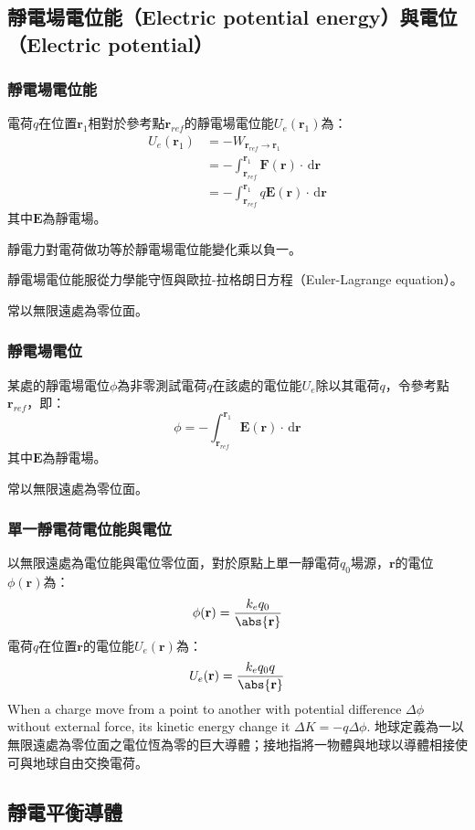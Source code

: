 \documentclass[a4paper,12pt]{report}
\begin{document}
\begin{itemize}
\subsection{靜電場電位能（Electric potential energy）與電位（Electric potential）}
\subsubsection{靜電場電位能}
電荷$q$在位置$\mathbf{r}_1$相對於參考點$\mathbf{r}_{ref}$的靜電場電位能$U_e(\mathbf{r}_1)$為：
\[\begin{aligned}
U_e(\mathbf{r}_1) &= -W_{\mathbf{r}_{ref}\to\mathbf{r}_1}\\
&= -\int_{\mathbf{r}_{ref}}^{\mathbf{r}_1} \mathbf{F}(\mathbf{r})\cdot\,\mathrm{d}\mathbf{r}\\
&= -\int_{\mathbf{r}_{ref}}^{\mathbf{r}_1} q\mathbf{E}(\mathbf{r})\cdot\,\mathrm{d}\mathbf{r}
\end{aligned}\]
其中$\mathbf{E}$為靜電場。

靜電力對電荷做功等於靜電場電位能變化乘以負一。

靜電場電位能服從力學能守恆與歐拉-拉格朗日方程（Euler-Lagrange equation）。

常以無限遠處為零位面。
\subsubsection{靜電場電位}
某處的靜電場電位$\phi$為非零測試電荷$q$在該處的電位能$U_e$除以其電荷$q$，令參考點$\mathbf{r}_{ref}$，即：
\[\phi=-\int_{\mathbf{r}_{ref}}^{\mathbf{r}_1} \mathbf{E}(\mathbf{r})\cdot\,\mathrm{d}\mathbf{r}\]
其中$\mathbf{E}$為靜電場。

常以無限遠處為零位面。
\subsubsection{單一靜電荷電位能與電位}
以無限遠處為電位能與電位零位面，對於原點上單一靜電荷$q_0$場源，$\mathbf{r}$的電位$\phi(\mathbf{r})$為：
\[\phi(\mathbf{r})=\frac{k_eq_0}{\abs{\mathbf{r}}}\]
電荷$q$在位置$\mathbf{r}$的電位能$U_e(\mathbf{r})$為：
\[U_e(\mathbf{r})=\frac{k_eq_0q}{\abs{\mathbf{r}}}\]
When a charge move from a point to another with potential difference $\Delta\phi$ without external force, its kinetic energy change it $\Delta K=-q\Delta\phi$.
地球定義為一以無限遠處為零位面之電位恆為零的巨大導體；接地指將一物體與地球以導體相接使可與地球自由交換電荷。
\subsection{靜電平衡導體}

\end{itemize}
\end{document}
